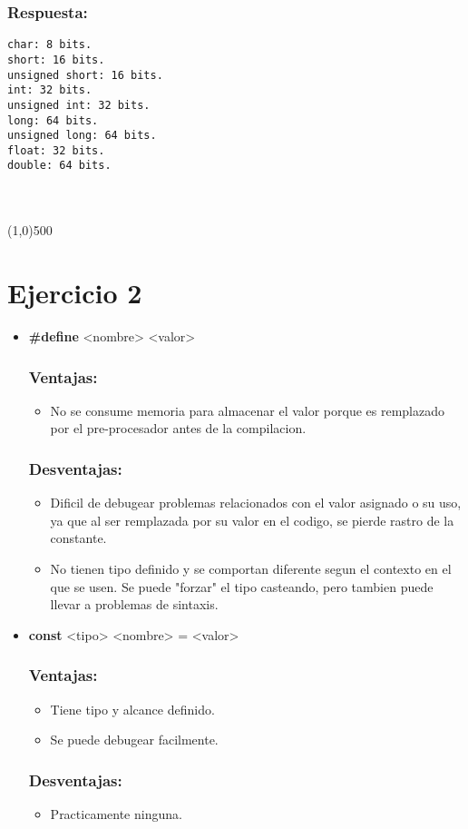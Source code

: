 \documentclass[letterpaper]{report}
\newcommand{\sectionh}[1]{\line(1,0){500}\section*{#1}}
\begin{document}
\subsubsection*{Respuesta:}
\begin{verbatim}
char: 8 bits.
short: 16 bits.
unsigned short: 16 bits.
int: 32 bits.
unsigned int: 32 bits.
long: 64 bits.
unsigned long: 64 bits.
float: 32 bits.
double: 64 bits.
\end{verbatim}
\ \\\\
\sectionh{Ejercicio 2}
\begin{itemize}
  \item \textbf{\#define} <nombre> <valor>
  \subsubsection*{Ventajas:}
   \begin{itemize}
     \item No se consume memoria para almacenar el valor porque es remplazado por el pre-procesador antes de la compilacion.
   \end{itemize}
  \subsubsection*{Desventajas:}
  \begin{itemize}
    \item Dificil de debugear problemas relacionados con el valor asignado o su uso, ya que al ser remplazada por su valor en el codigo, se pierde rastro de la constante.
    \item No tienen tipo definido y se comportan diferente segun el contexto en el que se usen. Se puede "forzar" el tipo casteando, pero tambien puede llevar a problemas de sintaxis.
  \end{itemize}
  \item \textbf{const} <tipo> <nombre> = <valor>
  \subsubsection*{Ventajas:}
  \begin{itemize}
    \item Tiene tipo y alcance definido.
    \item Se puede debugear facilmente.
  \end{itemize}
  \subsubsection*{Desventajas:}
  \begin{itemize}
    \item Practicamente ninguna.
  \end{itemize}
\end{itemize}
\end{document}
